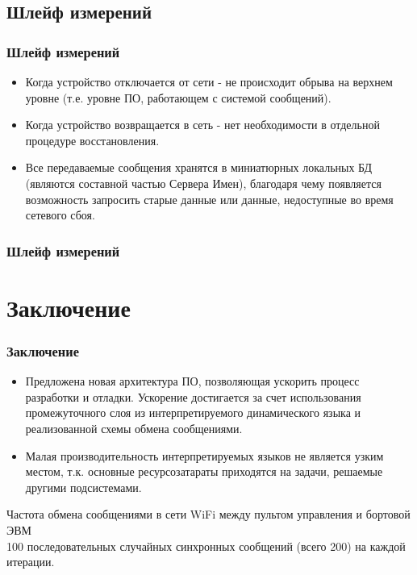 \documentclass{beamer}
\begin{document}
\subsection{Шлейф измерений}
\begin{frame} 
\frametitle{Шлейф измерений}
\begin{itemize}
  \item Когда устройство отключается от сети - не происходит обрыва на верхнем
  уровне (т.е. уровне ПО, работающем с системой сообщений).
  \item Когда устройство возвращается в сеть - нет
  необходимости в отдельной процедуре восстановления.
  \item Все передаваемые сообщения хранятся в миниатюрных локальных БД
  (являются составной частью Сервера Имен), благодаря чему появляется
  возможность запросить старые данные или данные, недоступные во время сетевого сбоя.
\end{itemize}
\end{frame}

\begin{frame} 
\frametitle{Шлейф измерений}

\end{frame}


\section{Заключение}
\begin{frame}

\frametitle{Заключение}
\begin{itemize}
  \item Предложена новая архитектура ПО, позволяющая ускорить
  процесс разработки и отладки. Ускорение достигается за счет использования
  промежуточного слоя из интерпретируемого динамического языка и реализованной
  схемы обмена сообщениями.
  \item Малая производительность интерпретируемых языков не является узким
  местом, т.к. основные ресурсозатараты приходятся на задачи, решаемые другими
  подсистемами.
\end{itemize}
\end{frame}

\begin{frame}
Частота обмена сообщениями в сети WiFi между пультом управления и
бортовой ЭВМ  \\
100 последовательных случайных синхронных сообщений (всего 200) на каждой
итерации.
\end{frame}
\end{document}
